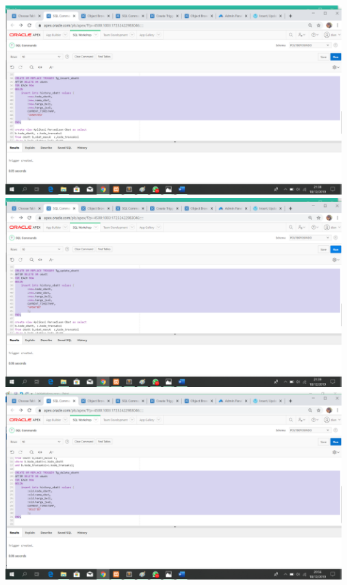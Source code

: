 \documentclass{article}
\begin{document}
\begin{center}
    \includegraphics[width=13cm]{figure/tginserted.png}
    \includegraphics[width=13cm]{figure/TGUPDATE.png}
    \includegraphics[width=13cm]{figure/triggercreated.png}
\end{center}
\end{document}
